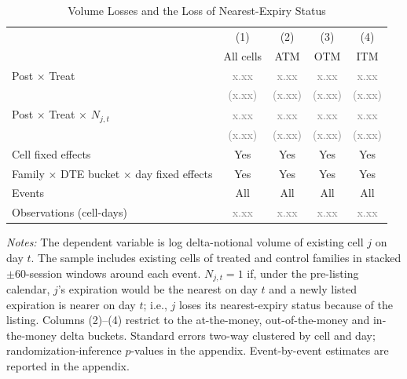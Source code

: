 \documentclass[11pt]{article}
\newcommand{\ph}{\textcolor{gray}{x.xx}}
\newcommand{\phse}{\textcolor{gray}{(x.xx)}}
\begin{document}
\begin{table}[H]
\centering\small
\begin{threeparttable}
\caption{Volume Losses and the Loss of Nearest-Expiry Status}
\begin{tabularx}{\textwidth}{l*{4}{C}}
\toprule
 & (1)       & (2) & (3) & (4) \\
 & All cells & ATM & OTM & ITM \\
\midrule
Post $\times$ Treat                    & \ph   & \ph   & \ph   & \ph \\
                                       & \phse & \phse & \phse & \phse \\
Post $\times$ Treat $\times$ $N_{j,t}$ & \ph   & \ph   & \ph   & \ph \\
                                       & \phse & \phse & \phse & \phse \\
\midrule
Cell fixed effects                                   & Yes & Yes & Yes & Yes \\
Family $\times$ DTE bucket $\times$ day fixed effects & Yes & Yes & Yes & Yes \\
Events                                               & All & All & All & All \\
Observations (cell-days)                             & \ph & \ph & \ph & \ph \\
\bottomrule
\end{tabularx}
\begin{tablenotes}
\footnotesize
\item[] \textit{Notes:} The dependent variable is log delta-notional volume of existing cell $j$ on day $t$. The sample includes existing cells of treated and control families in stacked $\pm$60-session windows around each event. $N_{j,t} = 1$ if, under the pre-listing calendar, $j$'s expiration would be the nearest on day $t$ and a newly listed expiration is nearer on day $t$; i.e., $j$ loses its nearest-expiry status because of the listing. Columns (2)--(4) restrict to the at-the-money, out-of-the-money and in-the-money delta buckets. Standard errors two-way clustered by cell and day; randomization-inference $p$-values in the appendix. Event-by-event estimates are reported in the appendix.
\end{tablenotes}
\end{threeparttable}
\end{table}
\end{document}
